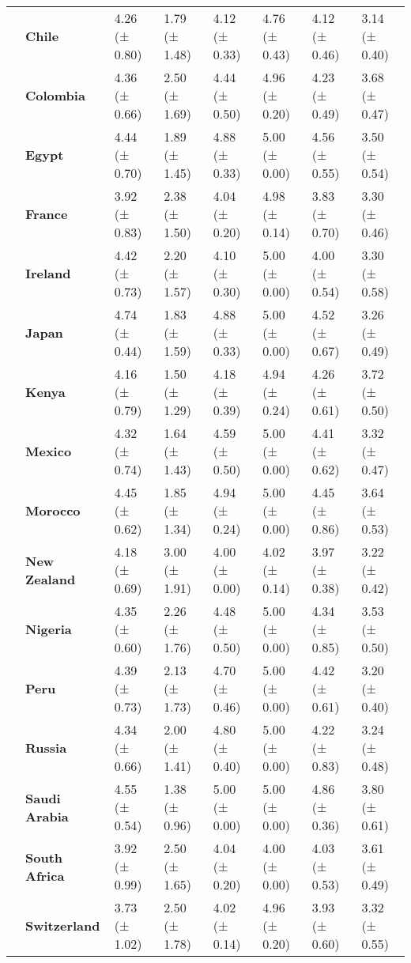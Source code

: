 \begin{tabular}{llllllll}
\textbf{} & \textbf{Chile} & 4.26 (± 0.80) & 1.79 (± 1.48) & 4.12 (± 0.33) & 4.76 (± 0.43) & 4.12 (± 0.46) & 3.14 (± 0.40) \\
\textbf{} & \textbf{Colombia} & 4.36 (± 0.66) & 2.50 (± 1.69) & 4.44 (± 0.50) & 4.96 (± 0.20) & 4.23 (± 0.49) & 3.68 (± 0.47) \\
\textbf{} & \textbf{Egypt} & 4.44 (± 0.70) & 1.89 (± 1.45) & 4.88 (± 0.33) & 5.00 (± 0.00) & 4.56 (± 0.55) & 3.50 (± 0.54) \\
\textbf{} & \textbf{France} & 3.92 (± 0.83) & 2.38 (± 1.50) & 4.04 (± 0.20) & 4.98 (± 0.14) & 3.83 (± 0.70) & 3.30 (± 0.46) \\
\textbf{} & \textbf{Ireland} & 4.42 (± 0.73) & 2.20 (± 1.57) & 4.10 (± 0.30) & 5.00 (± 0.00) & 4.00 (± 0.54) & 3.30 (± 0.58) \\
\textbf{} & \textbf{Japan} & 4.74 (± 0.44) & 1.83 (± 1.59) & 4.88 (± 0.33) & 5.00 (± 0.00) & 4.52 (± 0.67) & 3.26 (± 0.49) \\
\textbf{} & \textbf{Kenya} & 4.16 (± 0.79) & 1.50 (± 1.29) & 4.18 (± 0.39) & 4.94 (± 0.24) & 4.26 (± 0.61) & 3.72 (± 0.50) \\
\textbf{} & \textbf{Mexico} & 4.32 (± 0.74) & 1.64 (± 1.43) & 4.59 (± 0.50) & 5.00 (± 0.00) & 4.41 (± 0.62) & 3.32 (± 0.47) \\
\textbf{} & \textbf{Morocco} & 4.45 (± 0.62) & 1.85 (± 1.34) & 4.94 (± 0.24) & 5.00 (± 0.00) & 4.45 (± 0.86) & 3.64 (± 0.53) \\
\textbf{} & \textbf{New Zealand} & 4.18 (± 0.69) & 3.00 (± 1.91) & 4.00 (± 0.00) & 4.02 (± 0.14) & 3.97 (± 0.38) & 3.22 (± 0.42) \\
\textbf{} & \textbf{Nigeria} & 4.35 (± 0.60) & 2.26 (± 1.76) & 4.48 (± 0.50) & 5.00 (± 0.00) & 4.34 (± 0.85) & 3.53 (± 0.50) \\
\textbf{} & \textbf{Peru} & 4.39 (± 0.73) & 2.13 (± 1.73) & 4.70 (± 0.46) & 5.00 (± 0.00) & 4.42 (± 0.61) & 3.20 (± 0.40) \\
\textbf{} & \textbf{Russia} & 4.34 (± 0.66) & 2.00 (± 1.41) & 4.80 (± 0.40) & 5.00 (± 0.00) & 4.22 (± 0.83) & 3.24 (± 0.48) \\
\textbf{} & \textbf{Saudi Arabia} & 4.55 (± 0.54) & 1.38 (± 0.96) & 5.00 (± 0.00) & 5.00 (± 0.00) & 4.86 (± 0.36) & 3.80 (± 0.61) \\
\textbf{} & \textbf{South Africa} & 3.92 (± 0.99) & 2.50 (± 1.65) & 4.04 (± 0.20) & 4.00 (± 0.00) & 4.03 (± 0.53) & 3.61 (± 0.49) \\
\textbf{} & \textbf{Switzerland} & 3.73 (± 1.02) & 2.50 (± 1.78) & 4.02 (± 0.14) & 4.96 (± 0.20) & 3.93 (± 0.60) & 3.32 (± 0.55) \\

\end{tabular}
